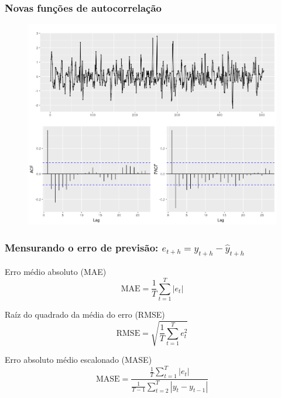\documentclass[mathserif,serif]{beamer}
\begin{document}
\begin{frame}
	\frametitle{Novas funções de autocorrelação}
	\begin{figure}
		\centering
		\includegraphics[scale=0.4]{last3weeks_acf.png}
	\end{figure}
\end{frame}

\begin{frame}	
	\frametitle{Mensurando o erro de previsão: $e_{t+h} = y_{t+h} - \hat{y}_{t+h}$}

	\begin{block}{Erro médio absoluto (MAE)}
		\begin{equation*}
			\text{MAE} = \frac{1}{T}\sum_{t=1}^{T}\left|e_{t}\right|
		\end{equation*}
	\end{block}
	
	\pause

	\begin{block}{Raíz do quadrado da média do erro (RMSE)}
		\begin{equation*}
			\text{RMSE} = \sqrt{\frac{1}{T}\sum_{t=1}^{T}e_{t}^2}
		\end{equation*}
	\end{block}

	\pause

	\begin{block}{Erro absoluto médio escalonado (MASE)}
		\begin{equation*}
			\text{MASE} = \frac{\frac{1}{T}\sum_{t=1}^T\left|e_t\right|}{\frac{1}{T-1}\sum_{t=2}^{T}\left|y_t-y_{t-1}\right|}
		\end{equation*}
	\end{block}
\end{frame}
\end{document}
